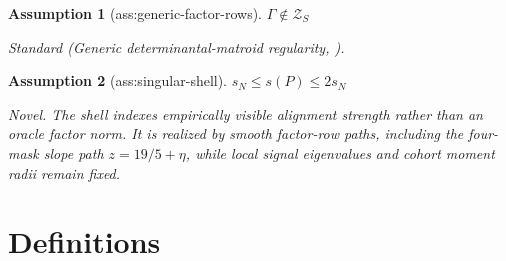 \documentclass{article}
\newtheorem{assumption}{Assumption}
\begin{document}
\begin{assumption}[ass:generic-factor-rows]\label{ass:generic-factor-rows}
\(\Gamma\notin\mathcal Z_S\)
\par\smallskip\noindent\emph{Standard} (Generic determinantal-matroid regularity, \cite{KiralyTheranTomioka2015}).
\end{assumption}

\begin{assumption}[ass:singular-shell]\label{ass:singular-shell}
\(s_N\le s(P)\le2s_N\)
\par\smallskip\noindent\emph{Novel.} The shell indexes empirically visible alignment strength rather than an oracle factor norm. It is realized by smooth factor-row paths, including the four-mask slope path \(z=19/5+\eta\), while local signal eigenvalues and cohort moment radii remain fixed.
\end{assumption}

\section{Definitions}
\end{document}
